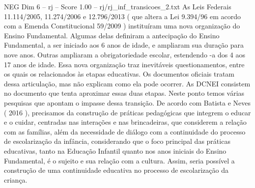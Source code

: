 \begin{textsample}{NEG Dim 6 – rj – Score 1.00 – rj/rj\_inf\_transicoes\_2.txt}
As Leis Federais 11.114/2005, 11.274/2006 e 12.796/2013 ( que altera a Lei 9.394/96 em acordo com a Emenda Constitucional 59/2009 ) instituíram uma nova organização do Ensino Fundamental.
Algumas delas definiram a antecipação do Ensino Fundamental, a ser iniciado aos 6 anos de idade, e ampliaram sua duração para nove anos.
Outras ampliaram a obrigatoriedade escolar, estendendo -a dos 4 aos 17 anos de idade.
Essa nova organização traz inevitáveis questionamentos, entre os quais os relacionados às etapas educativas.
Os documentos oficiais tratam dessa articulação, mas não explicam como ela pode ocorrer.
As DCNEI consistem no documento que tenta aproximar essas duas etapas.
Neste ponto temos várias pesquisas que apontam o impasse dessa transição.
De acordo com Batista e Neves ( 2016 ), precisamos da construção de práticas pedagógicas que integrem o educar e o cuidar, centradas nas interações e nas brincadeiras, que considerem a relação com as famílias, além da necessidade de diálogo com a continuidade do processo de escolarização da infância, considerando que o foco principal das práticas educativas, tanto na Educação Infantil quanto nos anos iniciais do Ensino Fundamental, é o sujeito e sua relação com a cultura.
Assim, seria possível a construção de uma continuidade educativa no processo de escolarização da criança.

\end{textsample}
